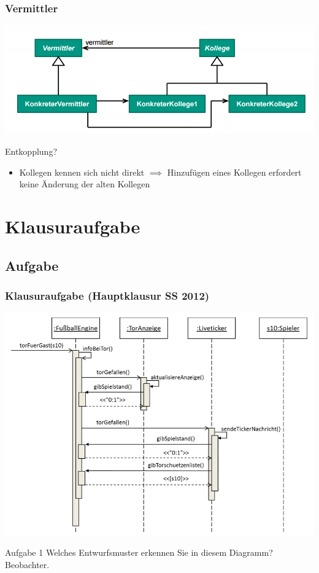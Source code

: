 \documentclass[18pt]{beamer}
\begin{document}
	\begin{frame}
		\frametitle{Vermittler}
		\centering
		\includegraphics[scale=0.45]{./pics/tut3/med.png}
		\begin{block}{Entkopplung?}
			\begin{itemize}
				\pause 
				\item Kollegen kennen sich nicht direkt  \linebreak \pause $\implies$ Hinzufügen eines Kollegen erfordert keine Änderung der alten Kollegen
			\end{itemize}
		\end{block}
	\end{frame}

\section{Klausuraufgabe}
	\subsection{Aufgabe}
	\begin{frame}
		\frametitle{Klausuraufgabe (Hauptklausur SS 2012)}
		\includegraphics[scale=0.35]{./pics/tut3/obs-task.png}	
		\begin{block}{Aufgabe 1}
			Welches Entwurfsmuster erkennen Sie in diesem Diagramm? \pause
			Beobachter.
		\end{block}
	\end{frame}
\end{document}
